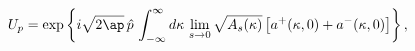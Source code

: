 \begin{equation}
U_{p}=\exp\left\{
i\sqrt{2\ap}\,\hat{p}\,\int_{-\infty}^{\infty}
d\kappa\,\lim_{s\to 0}\sqrt{A_s(\kappa)}\,\bigl[
a^{+}(\kappa,0)+a^{-}(\kappa,0)
\bigr]
\right\},
\end{equation}

